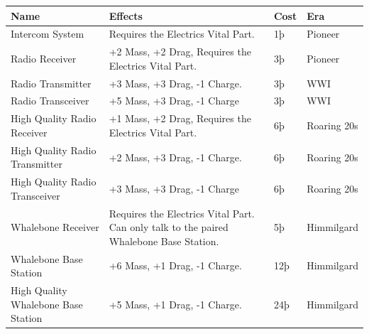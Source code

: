 \documentclass{article}
\begin{document}
\begin{tabular}{|l|l|l|l|}
    \hline
    Name                                & Effects                                              & Cost        & Era     \\\hline
    Intercom System                     & Requires the Electrics Vital Part.                   & 1þ          & Pioneer \\\hline
    Radio Receiver                      & +2 Mass, +2 Drag, Requires the Electrics Vital Part. &
    3þ                                  & Pioneer                                                                      \\\hline
    Radio Transmitter                   & +3 Mass, +3 Drag, -1 Charge.                         & 3þ          & WWI     \\\hline
    Radio Transceiver                   & +5 Mass, +3 Drag, -1 Charge                          & 3þ          & WWI     \\\hline
    High Quality Radio Receiver         & +1 Mass, +2 Drag, Requires the Electrics
    Vital Part.                         & 6þ                                                   & Roaring 20s           \\\hline
    High Quality Radio Transmitter      & +2 Mass, +3 Drag, -1 Charge.                         & 6þ          &
    Roaring 20s                                                                                                        \\\hline
    High Quality Radio Transceiver      & +3 Mass, +3 Drag, -1 Charge                          & 6þ          &
    Roaring 20s                                                                                                        \\\hline
    Whalebone Receiver                  & Requires the Electrics Vital Part. Can only talk to
    the paired Whalebone Base Station.  & 5þ                                                   & Himmilgard            \\\hline
    Whalebone Base Station              & +6 Mass, +1 Drag, -1 Charge.                         & 12þ         &
    Himmilgard                                                                                                         \\\hline
    High Quality Whalebone Base Station & +5 Mass, +1 Drag, -1 Charge.                         & 24þ
                                        & Himmilgard                                                                   \\\hline
\end{tabular}
\end{document}
